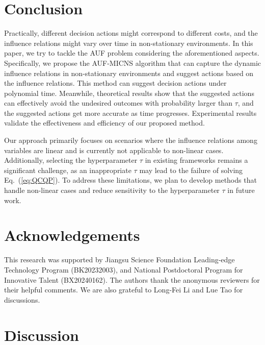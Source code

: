 \documentclass{article}
\theoremstyle{plain}
\theoremstyle{definition}
\theoremstyle{remark}
\def \Eq {Eq.}
\begin{document}
\section{Conclusion}
\label{sec:conclusion}
Practically, different decision actions might correspond to different costs, and the influence relations might vary over time in non-stationary environments. 
In this paper, we try to tackle the AUF problem considering the aforementioned aspects. 
Specifically, we propose the AUF-MICNS algorithm that can capture the dynamic influence relations in non-stationary environments and suggest actions based on the influence relations. 
This method can suggest decision actions under polynomial time. 
Meanwhile, theoretical results show that the suggested actions can effectively avoid the undesired outcomes with probability larger than $\tau$, 
and the suggested actions get more accurate as time progresses. 
Experimental results validate the effectiveness and efficiency of our proposed method.


Our approach primarily focuses on scenarios where the influence relations among variables are linear and is currently not applicable to non-linear cases. 
Additionally, selecting the hyperparameter \(\tau\) in existing frameworks remains a significant challenge, as an inappropriate \(\tau\) may lead to the failure of solving \Eq~(\ref{eq:QCQP}). To address these limitations, we plan to develop methods that handle non-linear cases and reduce sensitivity to the hyperparameter \(\tau\) in future work.

\section*{Acknowledgements}
This research was supported by Jiangsu Science Foundation Leading-edge Technology Program (BK20232003), and National Postdoctoral Program for Innovative Talent (BX20240162). 
The authors thank the anonymous reviewers for their helpful comments. 
We are also grateful to Long-Fei Li and Lue Tao for discussions.
\small



\newpage
\appendix
\onecolumn
\section{Discussion}
\label{sec:discuss}
\end{document}
